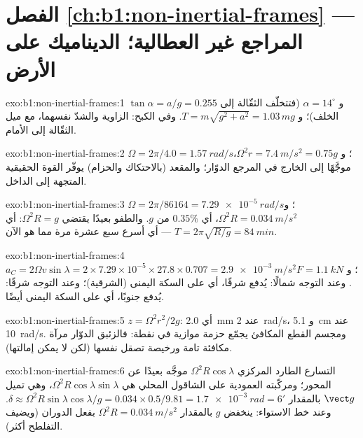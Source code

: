 \section*{الفصل \ref{ch:b1:non-inertial-frames} --- المراجع غير العطالية؛ الديناميك على الأرض}

\begin{solution}{exo:b1:non-inertial-frames:1}
$\tan\alpha = a/g = 0.255$ و $\alpha = 14^\circ$ (فتتخلّف الثقّالة إلى الخلف)؛
و $T = m\sqrt{g^2 + a^2} = 1.03\,mg$. وفي الكبح: الزاوية والشدّ نفسهما، مع ميل
الثقّالة إلى الأمام.
\end{solution}

\begin{solution}{exo:b1:non-inertial-frames:2}
$\Omega = 2\pi/4.0 = \qty{1.57}{rad/s}$؛ و $\Omega^2r = \qty{7.4}{m/s^2} = 0.75g$،
موجَّهًا إلى الخارج في المرجع الدوّار؛ والمقعد (بالاحتكاك
والحزام) يوفّر القوة الحقيقية المتجهة إلى الداخل.
\end{solution}

\begin{solution}{exo:b1:non-inertial-frames:3}
$\Omega = 2\pi/86164 = \qty{7.29e-5}{rad/s}$؛ و $\Omega^2R = \qty{0.034}{m/s^2}$،
أي $0.35\%$ من $g$. والطفو بعيدًا يقتضي $\Omega^2R = g$: أي $T = 2\pi\sqrt{R/g} =
\qty{84}{min}$ --- أي أسرع سبع عشرة مرة مما هو الآن.
\end{solution}

\begin{solution}{exo:b1:non-inertial-frames:4}
$a_C = 2\Omega v\sin\lambda = 2 \times 7.29\times10^{-5} \times 27.8 \times 0.707
= \qty{2.9e-3}{m/s^2}$؛ و $F = \qty{1.1}{kN}$. وعند التوجه شمالًا: يُدفع شرقًا،
أي على السكة اليمنى (الشرقية)؛ وعند التوجه شرقًا: يُدفع جنوبًا، أي على
السكة اليمنى أيضًا.
\end{solution}

\begin{solution}{exo:b1:non-inertial-frames:5}
$z = \Omega^2r^2/2g$: أي \qty{2.0}{mm} عند \qty{2}{rad/s}، و \qty{5.1}{cm} عند
\qty{10}{rad/s}. ومجسم القطع المكافئ يجمّع حزمة موازية في نقطة:
فالزئبق الدوّار مرآة مكافئة تامة ورخيصة تصقل نفسها
(لكن لا يمكن إمالتها).
\end{solution}

\begin{solution}{exo:b1:non-inertial-frames:6}
التسارع الطارد المركزي $\Omega^2R\cos\lambda$ موجَّه بعيدًا عن
المحور؛ ومركّبته العمودية على الشاقول المحلي هي $\Omega^2R\cos\lambda
\sin\lambda$، وهي تميل $\vect g$ بالمقدار $\delta \approx \Omega^2R\sin\lambda\cos\lambda/g
= 0.034 \times 0.5/9.81 = \qty{1.7e-3}{rad} = 6'$. وعند خط الاستواء: ينخفض $g$ بالمقدار
$\Omega^2R = \qty{0.034}{m/s^2}$ بفعل الدوران (ويضيف التفلطح أكثر).
\end{solution}

